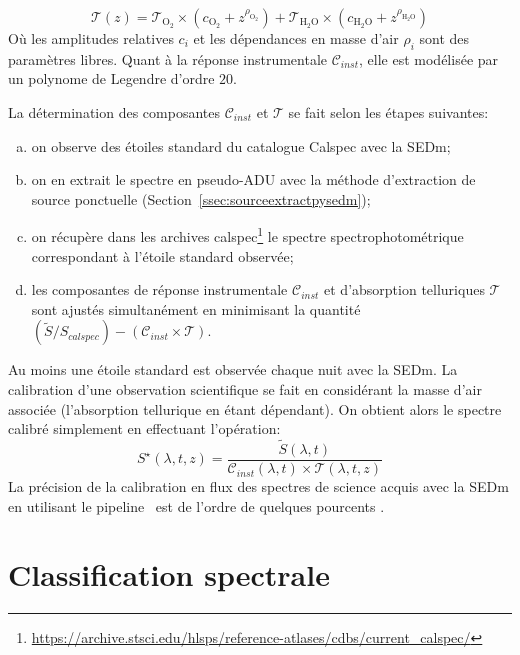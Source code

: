 \documentclass[../main/main.tex]{subfiles}
\begin{document}
\begin{equation}
  \label{eq:telluricpysedm}
  \mathcal{T}(z) =
  \mathcal{T}_{\text{O}_{2}}\times(c_{\text{O}_{2}}+z^{\rho_{\text{O}_{2}}})
  + \mathcal{T}_{\text{H}_{2}\text{O}}\times(c_{\text{H}_{2}\text{O}}+z^{\rho_{\text{H}_{2}\text{O}}})
\end{equation}
Où les amplitudes relatives $c_{i}$ et les dépendances en masse d'air
$\rho_{i}$ sont des paramètres libres. Quant à la réponse instrumentale
$\mathcal{C}_{inst}$, elle est modélisée par un polynome de Legendre d'ordre $20$.

La détermination des composantes $\mathcal{C}_{inst}$ et $\mathcal{T}$
se fait selon les étapes suivantes:

\begin{enumerate}[(a)]
  \itemsep=0em
\item on observe des étoiles standard du catalogue Calspec
  \citep{Bohlinstdcalpsec} avec la SEDm;
\item on en extrait le spectre en pseudo-ADU avec la méthode
  d'extraction de source ponctuelle
  (Section~\ref{ssec:sourceextractpysedm});
\item on récupère dans les archives calspec\footnote{\url{https://archive.stsci.edu/hlsps/reference-atlases/cdbs/current_calspec/}} le spectre
  spectrophotométrique correspondant à l'étoile standard observée;
\item les composantes de réponse instrumentale $\mathcal{C}_{inst}$ et
  d'absorption telluriques $\mathcal{T}$ sont ajustés simultanément en
  minimisant la quantité ~$(\tilde{S}/S_{calspec}) - (\mathcal{C}_{inst}\times\mathcal{T})$.
\end{enumerate}

Au moins une étoile standard est observée chaque nuit avec la SEDm. La calibration
d'une observation scientifique se fait en considérant la masse d'air
associée (l'absorption tellurique en étant dépendant). On obtient
alors le spectre calibré simplement en effectuant l'opération:
\begin{equation*}
  S^{\star}(\lambda,t,z)=\frac{\tilde{S}(\lambda,t)}{\mathcal{C}_{inst}(\lambda,t)\times\mathcal{T}(\lambda,t,z)}
\end{equation*}
La précision de la calibration en flux des spectres de science acquis
avec la SEDm en utilisant le pipeline \pysedm\ est de l'ordre de
quelques pourcents \citep{pysedm}.

\section{Classification spectrale}\label{sec:snid}
\end{document}
